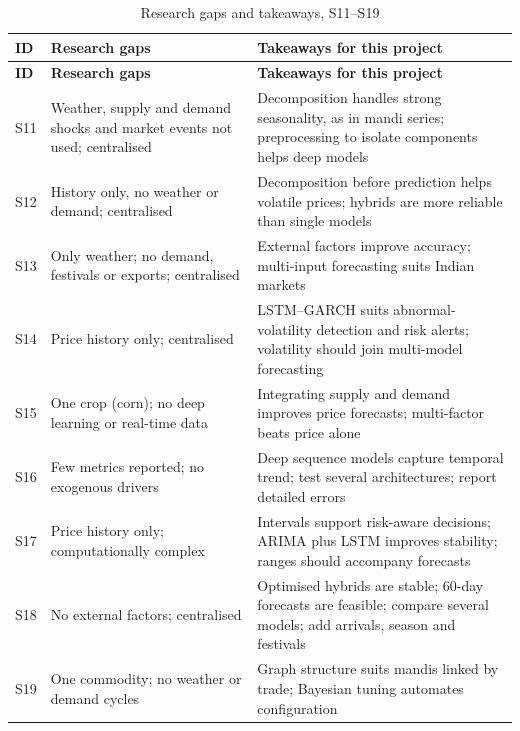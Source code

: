 {\footnotesize\setlength{\tabcolsep}{4pt}\renewcommand{\arraystretch}{1.15}
\begin{longtable}{|p{0.9cm}|p{6.4cm}|p{8.6cm}|}
\caption{Research gaps and takeaways, S11--S19}\label{tab:survey-g2}\\
\hline \textbf{ID} & \textbf{Research gaps} & \textbf{Takeaways for this project} \\ \hline \endfirsthead
\hline \textbf{ID} & \textbf{Research gaps} & \textbf{Takeaways for this project} \\ \hline \endhead
\hline \endfoot
S11 & Weather, supply and demand shocks and market events not used; centralised & Decomposition handles strong seasonality, as in mandi series; preprocessing to isolate components helps deep models \\ \hline
S12 & History only, no weather or demand; centralised & Decomposition before prediction helps volatile prices; hybrids are more reliable than single models \\ \hline
S13 & Only weather; no demand, festivals or exports; centralised & External factors improve accuracy; multi-input forecasting suits Indian markets \\ \hline
S14 & Price history only; centralised & LSTM--GARCH suits abnormal-volatility detection and risk alerts; volatility should join multi-model forecasting \\ \hline
S15 & One crop (corn); no deep learning or real-time data & Integrating supply and demand improves price forecasts; multi-factor beats price alone \\ \hline
S16 & Few metrics reported; no exogenous drivers & Deep sequence models capture temporal trend; test several architectures; report detailed errors \\ \hline
S17 & Price history only; computationally complex & Intervals support risk-aware decisions; ARIMA plus LSTM improves stability; ranges should accompany forecasts \\ \hline
S18 & No external factors; centralised & Optimised hybrids are stable; 60-day forecasts are feasible; compare several models; add arrivals, season and festivals \\ \hline
S19 & One commodity; no weather or demand cycles & Graph structure suits mandis linked by trade; Bayesian tuning automates configuration \\ \hline
\end{longtable}}

